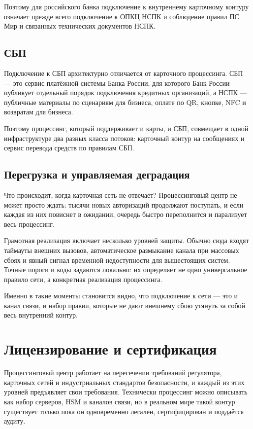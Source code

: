 Поэтому для российского банка подключение к внутреннему
карточному контуру означает прежде всего подключение
к ОПКЦ НСПК и соблюдение правил ПС Мир и связанных
технических документов НСПК.~\cite{nspk-mir-rules}

\subsection*{СБП}

Подключение к СБП архитектурно отличается от карточного
процессинга. СБП — это сервис платёжной системы Банка России,
для которого Банк России публикует отдельный порядок
подключения кредитных организаций, а НСПК — публичные
материалы по сценариям для бизнеса, оплате по QR, кнопке, NFC
и возвратам для бизнеса.~\cite{cbr-sbp-actions,sbp-main,sbp-faq-business}

Поэтому процессинг, который поддерживает и карты, и СБП,
совмещает в одной инфраструктуре два разных класса потоков:
карточный контур на сообщениях  и сервис перевода средств
по правилам СБП.~\cite{cbr-sbp-actions,sbp-main}

\subsection*{Перегрузка и управляемая деградация}

Что происходит, когда карточная сеть не отвечает? Процессинговый
центр не может просто ждать: тысячи новых авторизаций продолжают
поступать, и если каждая из них повиснет в ожидании, очередь
быстро переполнится и парализует весь процессинг.

Грамотная реализация включает несколько уровней защиты.
Обычно сюда входят таймауты внешних вызовов, автоматическое
размыкание канала при массовых сбоях и явный сигнал временной
недоступности для вышестоящих систем. Точные пороги и коды
задаются локально: их определяет не одно универсальное правило
сети, а конкретная реализация процессинга.

Именно в такие моменты становится видно, что подключение
к сети — это и канал связи, и набор правил, которые не дают
внешнему сбою утянуть за собой весь внутренний контур.

\section{Лицензирование и сертификация}
\label{sec:pc-licensing}

Процессинговый центр работает на пересечении требований
регулятора, карточных сетей и индустриальных стандартов
безопасности, и каждый из этих уровней предъявляет свои
требования. Технически процессинг можно описывать как набор
серверов, HSM и каналов связи, но в реальном мире такой
контур существует только пока он одновременно легален,
сертифицирован и поддаётся аудиту.

